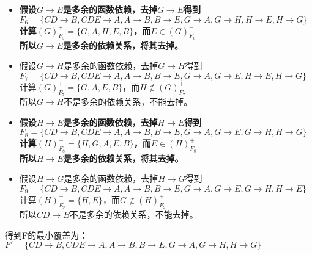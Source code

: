 \begin{enumerate}
\begin{itemize}
		\item 
		\textbf{假设$G \to E$是多余的函数依赖，去掉$G \to E$得到$F_{6}=\{CD \to B, CDE \to A, A \to B, B \to E, G \to A, G \to H, H \to E, H \to G\}$\\
		计算$(G)^{+}_{F_{5}}=\{G, A, H, E, B\}$，而$E \in (G)^{+}_{F_{6}}$ \\
		所以$G \to E$是多余的依赖关系，将其去掉。}
		
		\item 
		假设$G \to H$是多余的函数依赖，去掉$G \to H$得到$F_{7}=\{CD \to B, CDE \to A, A \to B, B \to E, G \to A, G \to E, H \to E, H \to G\}$\\
		计算$(G)^{+}_{F_{7}}=\{G, A, E, B\}$，而$H \notin (G)^{+}_{F_{7}}$ \\
		所以$G \to H$不是多余的依赖关系，不能去掉。
		
		\item 
		\textbf{假设$H \to E$是多余的函数依赖，去掉$H \to E$得到$F_{8}=\{CD \to B, CDE \to A, A \to B, B \to E, G \to A, G \to E, G \to H, H \to G\}$\\
		计算$(H)^{+}_{F_{8}}=\{H, G, A, E, B\}$，而$E \in (H)^{+}_{F_{8}}$ \\
		所以$H \to E$是多余的依赖关系，将其去掉。}
		
		\item 
		假设$H \to G$是多余的函数依赖，去掉$H \to G$得到$F_{9}=\{CD \to B, CDE \to A, A \to B, B \to E, G \to A, G \to E, G \to H, H \to E\}$\\
		计算$(H)^{+}_{F_{9}}=\{H, E\}$，而$G \notin (H)^{+}_{F_{9}}$ \\
		所以$CD \to B$不是多余的依赖关系，不能去掉。
	\end{itemize}
	得到F的最小覆盖为：\\
	$F'=\{CD \to B, CDE \to A, A \to B, B \to E, G \to A, G \to H, H \to G\}$
	

\end{enumerate}
